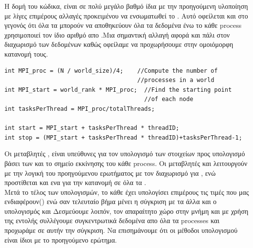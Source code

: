 \documentclass{article}
\begin{document}
Η δομή του κώδικα, είναι σε πολύ μεγάλο βαθμό ίδια με την προηγούμενη υλοποίηση με λίγες επιμέρους αλλαγές προκειμένου να ενσωματωθεί το . Αυτό οφείλεται και στο γεγονός ότι όλα τα  μπορούν να αποθηκεύουν όλα τα δεδομένα ένω το κάθε process χρησιμοποιεί τον ίδιο αριθμό απο  .Μια σημαντική αλλαγή αφορά και πάλι στον διαχωρισμό των δεδομένων καθώς οφείλαμε να προχωρήσουμε στην ομοιόμορφη κατανομή τους.
\vspace{10mm}
\begin{lstlisting}
int MPI_proc = (N / world_size)/4;    //Compute the number of 
                                      //processes in a world
int MPI_start = world_rank * MPI_proc;  //Find the starting point
                                        //of each node
int tasksPerThread = MPI_proc/totalThreads;

int start = MPI_start + tasksPerThread * threadID;
int stop = (MPI_start + tasksPerThread * threadID)+tasksPerThread-1;
\end{lstlisting}
\vspace{10mm}
Οι μεταβλητές ,  είναι υπεύθυνες για τον υπολογισμό των στοιχείων προς υπολογισμό βάσει των  και το σημείο εκκίνησης του κάθε process. Οι μεταβλητές  και  λειτουργούν με την λογική του προηγούμενου ερωτήματος με τον διαχωρισμό για , ενώ προστίθεται και ενα  για την κατανομή σε όλα τα .\\
\newpage
Μετά το τέλος των υπολογισμών, το κάθε  έχει υπολογίσει επιμέρους τις τιμές που μας ενδιαφέρουν() ενώ σαν τελευταίο βήμα μένει η σύγκριση με τα άλλα  και ο υπολογισμός  και  Δεσμεύουμε λοιπόν, τον απαραίτητο χώρο στην μνήμη και με χρήση της εντολής  συλλέγουμε συγκεντρωτικά δεδομένα απο όλα τα processes και προχωράμε σε αυτήν την σύγκριση. Να επισημάνουμε ότι οι μέθοδοι υπολογισμού είναι ίδιοι με το προηγούμενο ερώτημα. 
\end{document}
